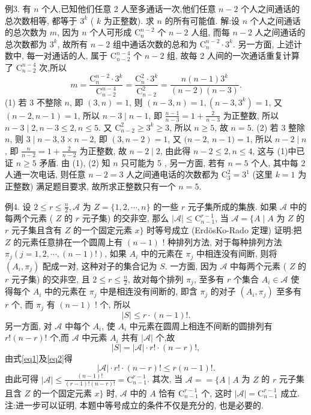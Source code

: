 例3. 有 $n$ 个人,已知他们任意 2 人至多通话一次,他们任意 $n-2$ 个人之间通话的总次数相等, 都等于 $3^k$ ( $k$ 为正整数). 求 $n$ 的所有可能值.
解:设 $n$ 个人之间通话的总次数为 $m$, 因为 $n$ 个人可形成 $\mathrm{C}_n^{n-2}$ 个 $n-2$ 人组, 而每 $n-2$ 人之间通话的总次数都为 $3^k$, 故所有 $n-2$ 组中通话次数的总和为 $\mathrm{C}_n^{n-2} \cdot 3^k$.
另一方面, 上述计数中, 每一对通话的人, 属于 $\mathrm{C}_{n-2}^{n-4}$ 个 $n-2$ 组, 故每 2 人间的一次通话重复计算了 $\mathrm{C}_{n-2}^{n-4}$ 次,所以
$$
m=\frac{\mathrm{C}_n^{n-2} \cdot 3^k}{\mathrm{C}_{n-2}^{n-4}}=\frac{\mathrm{C}_n^2 \cdot 3^k}{\mathrm{C}_{n-2}^2}=\frac{n(n-1) 3^k}{(n-2)(n-3)} .
$$
(1) 若 3 不整除 $n$, 即 $(3, n)=1$, 则 $(n-3, n)=1,\left(n-3,3^k\right)=1$, 又 $(n-2, n-1)=1$, 所以 $n-3 \mid n-1$, 即 $\frac{n-1}{n-3}=1+\frac{2}{n-3}$ 为正整数, 所以 $n-3 \mid 2, n-3 \leqslant 2, n \leqslant 5$. 又 $\mathrm{C}_{n-2}^2 \geqslant 3^k \geqslant 3$, 所以 $n \geqslant 5$, 故 $n=5$.
(2) 若 3 整除 $n$, 则 $3 \mid n-3,3 \times n-2$, 即 $(3, n-2)=1$, 又 $(n-2$, $n-1)=1$, 所以 $n-2 \mid n$, 即 $\frac{n}{n-2}=1+\frac{2}{n-2}$ 为正整数, 故 $n-2 \mid 2$, 由此得 $n-2 \leqslant 2, n \leqslant 4$, 这与 (1)中已证 $n \geqslant 5$ 矛盾.
由 (1), (2) 知 $n$ 只可能为 5 , 另一方面, 若有 $n=5$ 个人, 其中每 2 人通一次电话, 则任意 $n-2=3$ 人之间通电话的次数都为 $\mathrm{C}_3^2=3^1$ (这里 $k=1$ 为正整数) 满足题目要求, 故所求正整数只有一个 $n=5$.



例4. 设 $2 \leqslant r \leqslant \frac{n}{2}, \mathscr{A}$ 为 $Z=\{1,2, \cdots, n\}$ 的一些 $r$ 元子集所成的集族.
如果 $\mathscr{A}$ 中的每两个元素 ( $Z$ 的 $r$ 元子集) 的交非空, 那么 $|\mathscr{A}| \leqslant \mathrm{C}_{n-1}^{r-1}$, 当 $\mathscr{A}=\{A \mid A$ 为 $Z$ 的 $r$ 元子集且含有 $Z$ 的一个固定元素 $x\}$ 时等号成立 (ErdösKo-Rado 定理)
证明:把 $Z$ 的元素任意排在一个圆周上有 $(n-1)$ ! 种排列方法, 对于每种排列方法 $\pi_j(j=1,2, \cdots,(n-1) !)$, 如果 $A_i$ 中的元素在 $\pi_j$ 中相连没有间断, 则将 $\left(A_i, \pi_j\right)$ 配成一对, 这种对子的集合记为 $S$. 一方面, 因为 $\mathscr{A}$ 中每两个元素 ( $Z$ 的 $r$ 元子集) 的交非空, 且 $2 \leqslant r \leqslant \frac{n}{2}$, 故对每个排列 $\pi_j$, 至多有 $r$ 个集合 $A_i \in \mathscr{A}$ 使得每个 $A_i$ 中的元素在 $\pi_j$ 中是相连没有间断的, 即含 $\pi_j$ 的对子 $\left(A_i, \pi_j\right)$ 至多有 $r$ 个, 而 $\pi_j$ 有 $(n-1)$ ! 个, 所以
$$
|S| \leqslant r \cdot(n-1) ! . \label{eq1}
$$
另一方面, 对 $\mathscr{A}$ 中每个 $A_i$, 使 $A_i$ 中元素在圆周上相连不间断的圆排列有 $r !(n-r) !$ 个,而 $\mathscr{A}$ 中元素 $A_i$ 共有 $|\mathscr{A}|$ 个,故
$$
|S|=|\mathscr{A}| \cdot r ! \cdot(n-r) !,  \label{eq2}
$$
由式\ref{eq1}及\ref{eq2}得
$$
|\mathscr{A}| \cdot r ! \cdot(n-r) ! \leqslant r(n-1) ! .
$$
由此可得 $|\mathscr{A}| \leqslant \frac{(n-1) !}{(r-1) !(n-r) !}=\mathrm{C}_{n-1}^{r-1}$.
其次, 当 $\mathscr{A}==\{A \mid A$ 为 $Z$ 的 $r$ 元子集且含 $Z$ 的一个固定元素 $x\}$ 时, $\mathscr{A}$ 中的 $A$ 恰有 $\mathrm{C}_{n-1}^{r-1}$ 个, 这时 $|\mathscr{A}|=\mathrm{C}_{n-1}^{r-1}$ 成立.
注:进一步可以证明, 本题中等号成立的条件不仅是充分的, 也是必要的.



